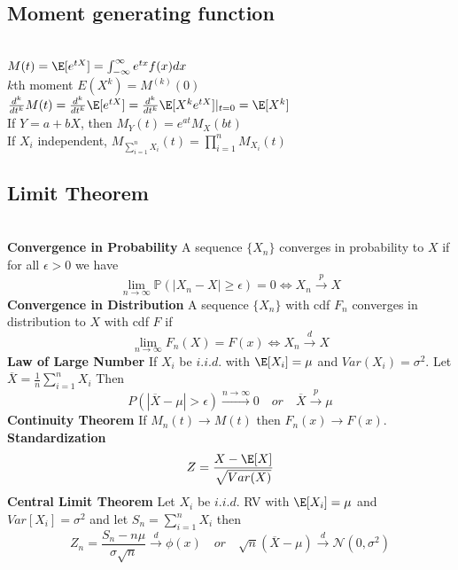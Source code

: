 \documentclass[8pt]{article}
\begin{document}
\begin{multicols}{3}
{  \subsection*{Moment generating function} \\
  $M(t) = \E[e^{tX}] = \int_{-\infty}^{\infty} e^{tx} f(x)dx$\\
  $k$th moment $E(X^k) = M^{(k)}(0)$\\
  $\frac{d^k}{dt^k}M(t) = \frac{d^k}{dt^k}\E[e^{tX}] = \frac{d^k}{dt^k}\E[X^k e^{tX}]|_{t=0} = \E[X^k]$\\
  If $Y = a+bX$, then $M_Y(t) = e^{at}M_X(bt)$\\
  If $X_i$ independent, $M_{\sum_{i=1}^n X_i}(t) = \prod_{i=1}^n M_{X_i}(t)$\\

  \subsection*{Limit Theorem}\\
  \textbf{Convergence in Probability} A sequence $\{ X_n\}$ converges in probability to $X$ if for all $\epsilon> 0$ we have
  \[
    \lim_{n\to\infty}\mathbb{P}(|X_n - X| \geq \epsilon) = 0 \iff X_n \stackrel{p}{\to} X
  \]
  \textbf{Convergence in Distribution} A sequence $\{ X_n \}$ with cdf $F_n$ converges in distribution to $X$ with cdf $F$ if
  \[
    \lim_{n\to\infty} F_n(X) = F(x) \iff X_n \stackrel{d}{\to} X
  \]
  \textbf{Law of Large Number} If $X_i$ be $i.i.d.$ with $\E[X_i] = \mu$ and $Var(X_i) = \sigma^2$. Let $\overline{X} = \frac{1}{n}\sum_{i=1}^n X_i$ Then
  \[
    P\left( \left|\overline{X}- \mu \right| > \epsilon \right) \stackrel{n\to\infty}{\to} 0 \quad or \quad \overline{X} \overset{p}{\rightarrow} \mu
  \]
  \textbf{Continuity Theorem} If $M_n(t) \to M(t)$ then $F_n(x)\to F(x)$.\\
  \textbf{Standardization}
  \[
    Z = \frac{X - \E[X]}{\sqrt{Var(X)}}
  \]
  \textbf{Central Limit Theorem} Let $X_i$ be $i.i.d.$ RV with $\E[X_i] = \mu$ and $Var[X_i] = \sigma^2$ and let $S_n = \sum_{i=1}^n X_i$ then
  \[
    Z_n = \frac{S_n - n\mu}{\sigma \sqrt{n}} \stackrel{d}{\to} \phi(x) \quad or \quad \sqrt{n}(\overline{X}-\mu) \stackrel{d}{\to} \mathcal{N}(0, \sigma^2)
  \]

}
\end{multicols}
\end{document}
